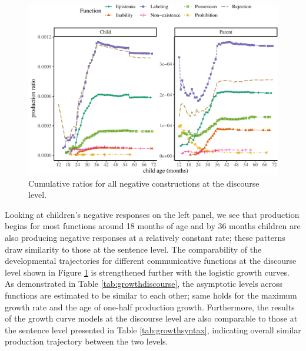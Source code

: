 \documentclass[
  english,
  man,floatsintext]{apa6}
\begin{document}
\begin{figure}[H]

{\centering \includegraphics{neg_construction_article_files/figure-latex/alldiscourse-1} 

}

\caption{Cumulative ratios for all negative constructions at the discourse level.}\label{fig:alldiscourse}
\end{figure}

Looking at children's negative responses on the left panel, we see that production begins for most functions around 18 months of age and by 36 months children are also producing negative responses at a relatively constant rate; these patterns draw similarity to those at the sentence level. The comparability of the developmental trajectories for different communicative functions at the discourse level shown in Figure \ref{fig:alldiscourse} is strengthened further with the logistic growth curves. As demonstrated in Table \ref{tab:growthdiscourse}, the asymptotic levels across functions are estimated to be similar to each other; same holds for the maximum growth rate and the age of one-half production growth. Furthermore, the results of the growth curve models at the discourse level are also comparable to those at the sentence level presented in Table \ref{tab:growthsyntax}, indicating overall similar production trajectory between the two levels.
\end{document}
